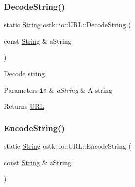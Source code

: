 \subsubsection{\texorpdfstring{Decode\+String()}{DecodeString()}}
{\footnotesize\ttfamily static \hyperlink{namespaceostk_1_1io_a95d49b120613a7610cb1b4f03b1116b6}{String} ostk\+::io\+::\+U\+R\+L\+::\+Decode\+String (\begin{DoxyParamCaption}\item[{const \hyperlink{namespaceostk_1_1io_a95d49b120613a7610cb1b4f03b1116b6}{String} \&}]{a\+String }\end{DoxyParamCaption})\hspace{0.3cm}{\ttfamily [static]}}



Decode string. 





\begin{DoxyParams}[1]{Parameters}
\mbox{\tt in}  & {\em a\+String} & A string \\
\hline
\end{DoxyParams}
\begin{DoxyReturn}{Returns}
\hyperlink{classostk_1_1io_1_1_u_r_l}{U\+RL} 
\end{DoxyReturn}
\mbox{\label{classostk_1_1io_1_1_u_r_l_aefa7a336010b16d6a658932953648481}} 
\subsubsection{\texorpdfstring{Encode\+String()}{EncodeString()}}
{\footnotesize\ttfamily static \hyperlink{namespaceostk_1_1io_a95d49b120613a7610cb1b4f03b1116b6}{String} ostk\+::io\+::\+U\+R\+L\+::\+Encode\+String (\begin{DoxyParamCaption}\item[{const \hyperlink{namespaceostk_1_1io_a95d49b120613a7610cb1b4f03b1116b6}{String} \&}]{a\+String }\end{DoxyParamCaption})\hspace{0.3cm}{\ttfamily [static]}}



